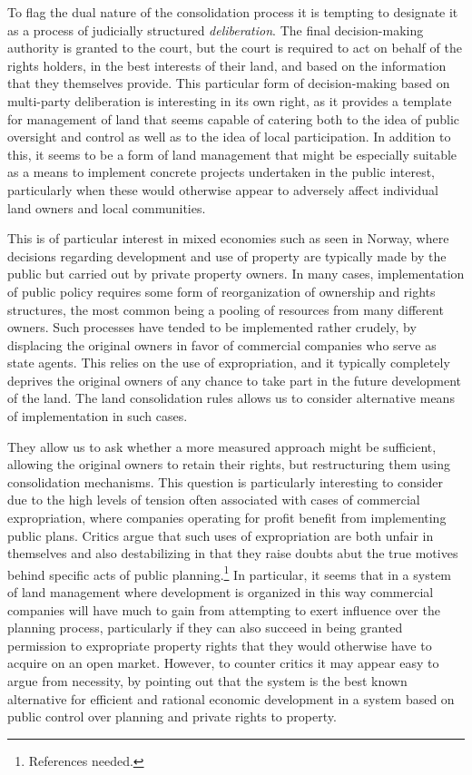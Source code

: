 \documentclass[10pt]{article} %
\begin{document}
To flag the dual nature of the consolidation process it is tempting to designate it as a process of judicially structured \emph{deliberation}. The final decision-making authority is granted to the court, but the court is required to act on behalf of the rights holders, in the best interests of their land, and based on the information that they themselves provide. This particular form of decision-making based on multi-party deliberation is interesting in its own right, as it provides a template for management of land that seems capable of catering both to the idea of public oversight and control as well as to the idea of local participation. In addition to this, it seems to be a form of land management that might be especially suitable as a means to implement concrete projects undertaken in the public interest, particularly when these would otherwise appear to adversely affect individual land owners and local communities.

This is of particular interest in mixed economies such as seen in Norway, where decisions regarding development and use of property are typically made by the public but carried out by private property owners. In many cases, implementation of public policy requires some form of reorganization of ownership and rights structures, the most common being a pooling of resources from many different owners. Such processes have tended to be implemented rather crudely, by displacing the original owners in favor of commercial companies who serve as state agents. This relies on the use of expropriation, and it typically completely deprives the original owners of any chance to take part in the future development of the land. The land consolidation rules allows us to consider alternative means of implementation in such cases. 

They allow us to ask whether a more measured approach might be sufficient, allowing the original owners to retain their rights, but restructuring them using consolidation mechanisms. This question is particularly interesting to consider due to the high levels of tension often associated with cases of commercial expropriation, where companies operating for profit benefit from implementing public plans. Critics argue that such uses of expropriation are both unfair in themselves and also destabilizing in that they raise doubts abut the true motives behind specific acts of public planning.\footnote{References needed.} In particular, it seems that in a system of land management where development is organized in this way commercial companies will have much to gain from attempting to exert influence over the planning process, particularly if they can also succeed in being granted permission to expropriate property rights that they would otherwise have to acquire on an open market. However, to counter critics it may appear easy to argue from necessity, by pointing out that the system is the best known alternative for efficient and rational economic development in a system based on public control over planning and private rights to property.
\end{document}
